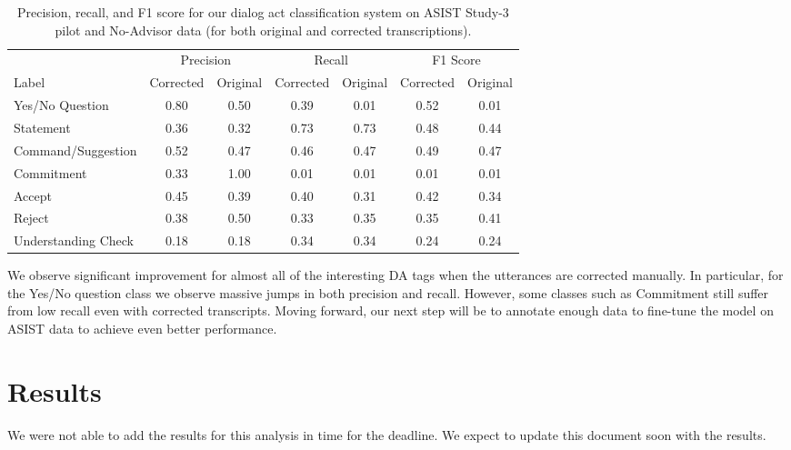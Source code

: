 \begin{table}
    \centering
    \begin{tabular}{l cc cc cc}
        \toprule
                            & \multicolumn{2}{c}{Precision} & \multicolumn{2}{c}{Recall} & \multicolumn{2}{c}{F1 Score}\\
                                \cmidrule(lr){2-3} \cmidrule(lr){4-5} \cmidrule(lr){6-7}
       Label                & Corrected & Original & Corrected & Original & Corrected & Original\\
                             \midrule
        Yes/No Question      & 0.80     & 0.50      & 0.39     & 0.01      & 0.52     & 0.01\\
        Statement            & 0.36     & 0.32      & 0.73     & 0.73      & 0.48     & 0.44\\
        Command/Suggestion   & 0.52     & 0.47      & 0.46     & 0.47      & 0.49     & 0.47\\
        Commitment           & 0.33     & 1.00      & 0.01     & 0.01      & 0.01     & 0.01\\
        Accept               & 0.45     & 0.39      & 0.40     & 0.31      & 0.42     & 0.34\\
        Reject               & 0.38     & 0.50      & 0.33     & 0.35      & 0.35     & 0.41\\
        Understanding Check  & 0.18     & 0.18      & 0.34     & 0.34      & 0.24     & 0.24\\
        \bottomrule
    \end{tabular}
    \caption{%
        Precision, recall, and F1 score for our dialog act classification
        system on ASIST Study-3 pilot and No-Advisor data (for both original and
        corrected transcriptions).
    }
    \label{tab:da_results}
\end{table}

We observe significant improvement for almost all of the interesting DA tags
when the utterances are corrected manually. In particular, for the Yes/No
question class we observe massive jumps in both precision and recall. However,
some classes such as Commitment still suffer from low recall even with
corrected transcripts. Moving forward, our next step will be to annotate enough
data to fine-tune the model on ASIST data to achieve even better performance.


\section{Results}

We were not able to add the results for this analysis in time for the deadline.
We expect to update this document soon with the results.
